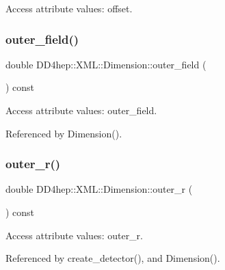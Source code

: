 Access attribute values\+: offset. 

\hypertarget{struct_d_d4hep_1_1_x_m_l_1_1_dimension_a40907564ab825308af9dd03ec1f7647f}{}\label{struct_d_d4hep_1_1_x_m_l_1_1_dimension_a40907564ab825308af9dd03ec1f7647f} 
\subsubsection{\texorpdfstring{outer\+\_\+field()}{outer\_field()}}
{\footnotesize\ttfamily double D\+D4hep\+::\+X\+M\+L\+::\+Dimension\+::outer\+\_\+field (\begin{DoxyParamCaption}{ }\end{DoxyParamCaption}) const}



Access attribute values\+: outer\+\_\+field. 



Referenced by Dimension().

\hypertarget{struct_d_d4hep_1_1_x_m_l_1_1_dimension_a7461ae48cd5a2b3038e5c418a280fe32}{}\label{struct_d_d4hep_1_1_x_m_l_1_1_dimension_a7461ae48cd5a2b3038e5c418a280fe32} 
\subsubsection{\texorpdfstring{outer\+\_\+r()}{outer\_r()}}
{\footnotesize\ttfamily double D\+D4hep\+::\+X\+M\+L\+::\+Dimension\+::outer\+\_\+r (\begin{DoxyParamCaption}{ }\end{DoxyParamCaption}) const}



Access attribute values\+: outer\+\_\+r. 



Referenced by create\+\_\+detector(), and Dimension().

\hypertarget{struct_d_d4hep_1_1_x_m_l_1_1_dimension_abf65cc7165b2abbf87b3d482ad7a433e}{}\label{struct_d_d4hep_1_1_x_m_l_1_1_dimension_abf65cc7165b2abbf87b3d482ad7a433e} 
